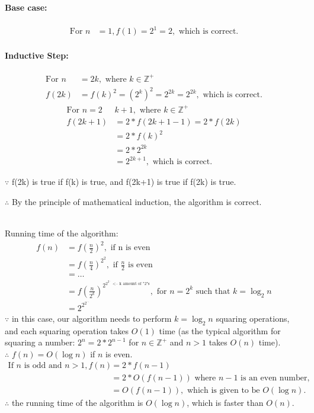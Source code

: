 \documentclass{article}
\begin{document}
\paragraph*{Base case:}
\begin{align*}
\text{For } n &= 1, f(1) = 2^1 = 2, \text{ which is correct.}
\end{align*}

\paragraph*{Inductive Step:}
\begin{align*}
\text{For } n &= 2k, \text{ where } k \in \mathbb{Z}^+ \\
f(2k) &= f(k)^2 = (2^k)^2 = 2^{2k} = 2^{2k}, \text{ which is correct.}
\end{align*}
\begin{align*}
\text{For } n = 2&k+1, \text{ where } k \in \mathbb{Z}^+ \\
f(2k+1) &= 2 * f(2k+1-1) = 2 * f(2k) \\
&= 2 * f(k)^2 \\
&= 2 * 2^{2k} \\
&= 2^{2k+1}, \text{ which is correct.}
\end{align*}

$\because$ f(2k) is true if f(k) is true, and f(2k+1) is true if f(2k) is true.

$\therefore$ By the principle of mathematical induction, the algorithm is correct.

\text{ } \\
Running time of the algorithm:
\begin{align*}
f(n) &= f(\frac{n}{2})^2, \text{ if n is even} \\
&= f(\frac{n}{4})^{2^2}, \text{ if } \frac{n}{2} \text{ is even} \\
&= \dots \\
&= f(\frac{n}{2^k})^{2^{2^{2^{\dots}} \text{ <-- k amount of "2"s}}}, \text{ for } n = 2^k \text{ such that } k = \log_2 n \\
&= 2^{2^{2^{\dots}}}
\end{align*}
$\because$ in this case, our algorithm needs to perform $k = \log_2 n$ squaring operations, and each squaring operation takes $O(1)$ time (as the typical algorithm for squaring a number: $2^n = 2 * 2^{n-1}$ for $n \in \mathbb{Z}^+$ and $n>1$ takes $O(n)$ time). \\
$\therefore$ $f(n) = O(\log n)$ if $n$ is even.
\begin{align*}
\text{If } n \text{ is odd and } n>1, f(n) &= 2 * f(n-1) \\
&= 2 * O(f(n - 1)) \text{ where } n - 1 \text{ is an even number, } \\
&= O(f(n - 1)), \text{ which is given to be } O(\log n).
\end{align*}
$\therefore$ the running time of the algorithm is $O(\log n)$, which is faster than $O(n)$.
\end{document}
